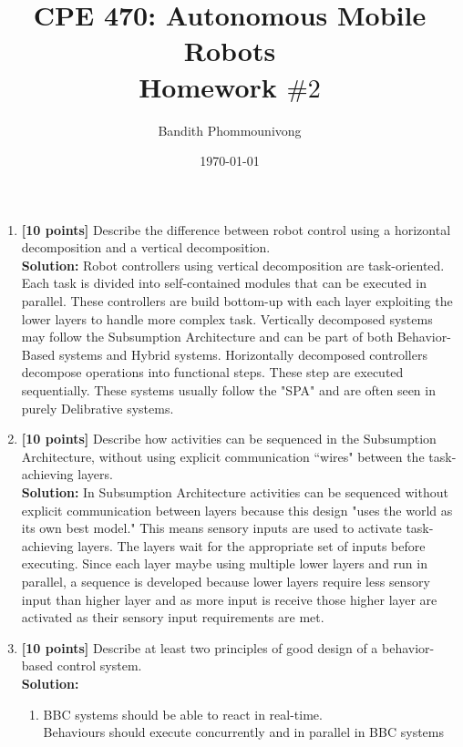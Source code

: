 \documentclass{article}
\title{CPE 470: Autonomous Mobile Robots \\ Homework $\#2$}
\author{Bandith Phommounivong}
\date{\today}
\begin{document}
\maketitle

\newpage
\begin{enumerate}
\item \textbf{[10 points]} Describe the difference between robot control using a horizontal decomposition and a vertical decomposition.\\

\textbf{Solution:} Robot controllers using vertical decomposition are task-oriented. Each task is divided into self-contained modules that can be executed in parallel. These controllers are build bottom-up with each layer exploiting the lower layers to handle more complex task. Vertically decomposed systems may follow the Subsumption Architecture and can be part of both Behavior-Based systems and Hybrid systems.
Horizontally decomposed controllers decompose operations into functional steps. These step are executed sequentially. These systems usually follow the "SPA" and are often seen in purely Delibrative systems. 
\newline

\item \textbf{[10 points]} Describe how activities can be sequenced in the Subsumption Architecture, without using explicit communication ``wires" between the task-achieving layers.\\

\textbf{Solution:} In Subsumption Architecture activities can be sequenced without explicit communication between layers because this design "uses the world as its own best model." This means sensory inputs are used to activate task-achieving layers. The layers wait for the appropriate set of inputs before executing. Since each layer maybe using multiple lower layers and run in parallel, a sequence is developed because lower layers require less sensory input than higher layer and as more input is receive those higher layer are activated as their sensory input requirements are met.
\newline

\item \textbf{[10 points]} Describe at least two principles of good design of a behavior-based control system.\\

\textbf{Solution:}
    \begin{enumerate}
        \item{BBC systems should be able to react in real-time.}\\
        Behaviours should execute concurrently and in parallel in BBC systems
        \newline


\end{enumerate}
\end{enumerate}
\end{document}
